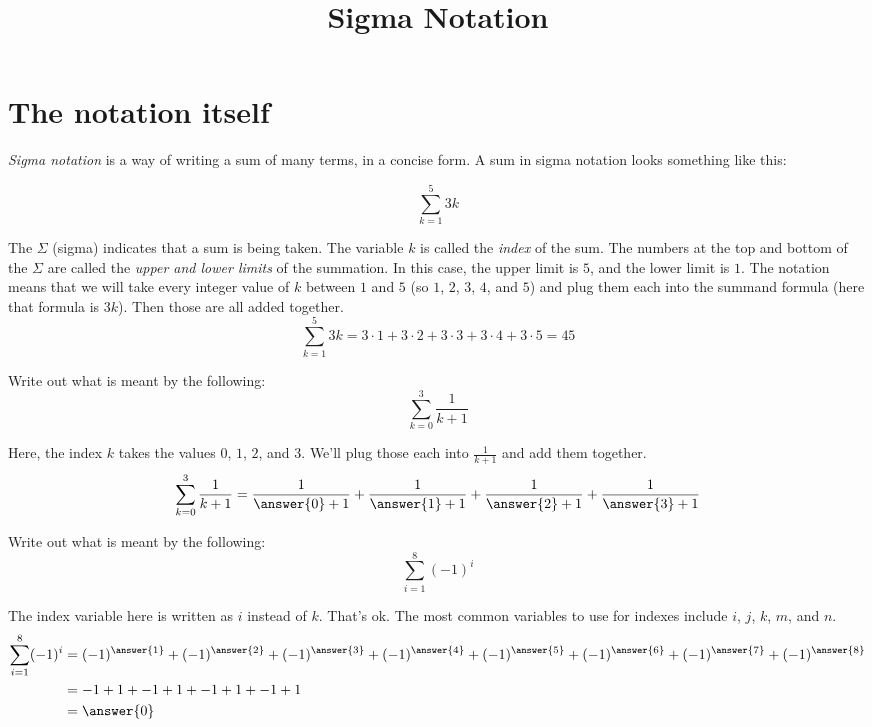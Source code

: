 \documentclass[12pt]{ximera}
\title{Sigma Notation}
\date{}
\author{}
\theoremstyle{definition}
\newcommand{\hop}{\vskip 0.18in}
\begin{document}


\section{The notation itself}
\emph{Sigma notation} is a way of writing a sum of many terms, in a concise form.  A sum in sigma notation looks something like this:

\[ \sum_{k=1}^{5} 3k \]

The $\Sigma$ (sigma) indicates that a sum is being taken.  The variable $k$ is called the \emph{index} of the sum.  The numbers at the top and bottom of the $\Sigma$
are called the \emph{upper and lower limits} of the summation.  In this case, the upper limit is $5$, and the lower limit is $1$.  The notation means that we will take
every integer value of $k$ between $1$ and $5$ (so $1$, $2$, $3$, $4$, and $5$) and plug them each into the summand formula (here that formula is $3k$).
Then those are all added together.
\[ \sum_{k=1}^{5} 3k= 3\cdot 1 + 3\cdot 2 + 3\cdot 3 + 3\cdot 4 + 3\cdot 5 = 45 \]
\hop


\begin{example}
	Write out what is meant by the following:
	\[ \sum_{k=0}^{3} \frac{1}{k+1}\]
	\begin{explanation}
		Here, the index $k$ takes the values $0$, $1$, $2$, and $3$.  We'll plug those each into $\frac{1}{k+1}$ and add them together.
		\[\sum_{k=0}^3 \frac{1}{k+1} = \frac{1}{\answer{0}+1} + \frac{1}{\answer{1}+1} + \frac{1}{\answer{2}+1} + \frac{1}{\answer{3}+1} \]
	\end{explanation}
\end{example}


\hop

\begin{example}
	Write out what is meant by the following:
	\[ \sum_{i=1}^{8} \left(-1\right)^i \]
	\begin{explanation}
		The index variable here is written as $i$ instead of $k$.  That's ok.  The most common variables to use for indexes include $i$, $j$, $k$, $m$, and $n$.
		\begin{align*}
			\sum_{i=1}^8 (-1)^i &= (-1)^{\answer{1}} + (-1)^{\answer{2}} + (-1)^{\answer{3}} + (-1)^{\answer{4}} + (-1)^{\answer{5} }+ (-1)^{\answer{6}} + (-1)^{\answer{7}} + (-1)^{\answer{8}} \\
				&= -1 + 1 + -1 + 1 + -1 + 1 + -1 + 1\\
				&= \answer{0}
		\end{align*}	
	\end{explanation}
\end{example}
\hop
\end{document}
